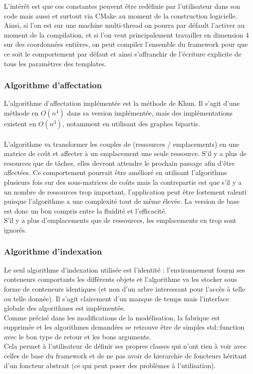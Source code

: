 L'intérêt est que ces constantes peuvent être redéfinie par l'utilisateur dans son code mais aussi et surtout via CMake au moment de la construction logicielle. Ainsi, si l'on est sur une machine multi-thread on pourra par défault l'activer au moment de la compilation, et si l'on veut principalement travailler en dimension 4 sur des coordonnées entières, on peut compiler l'ensemble du framework pour que ce soit le comportement par défaut et ainsi s'affranchir de l'écriture explicite de tous les paramètres des templates. 

\subsubsection{Algorithme d'affectation}

L'algorithme d'affectation implémentée est la méthode de Khun. Il s'agit d'une méthode en $O(n^4)$ dans sa version implémentée, mais des implémentations existent en $O(n^3)$, notamment en utilisant des graphes bipartis.\\\\
L'algorithme va transformer les couples de (ressources / emplacements) en une matrice de coût et affecter à un emplacement une seule ressource. S'il y a plus de resources que de tâches, elles devront attendre le prochain passage afin d'être affectées. Ce comportement pourrait être amélioré en utilisant l'algorithme plusieurs fois sur des sous-matrices de coûts mais la contrepartie est que s'il y a un nombre de ressources trop important, l'application peut être fortement ralenti puisque l'algorithme a une complexité tout de même élevée. La version de base est donc un bon compris entre la fluidité et l'efficacité.\\
S'il y a plus d'emplacements que de ressources, les emplacements en trop sont ignorés.

\subsubsection{Algorithme d'indexation}

Le seul algorithme d'indexation utilisée est l'identité : l'environnement fourni ses conteneurs comportants les différents objets et l'algorithme va les stocker sous forme de conteneurs identiques (et non d'un arbre interessant pour l'accès à telle ou telle donnée). Il s'agit clairement d'un manque de temps mais l'interface globale des algorithmes est implémentée.\\
Comme précisé dans les modifications de la modélisation, la fabrique est supprimée et les algorithmes demandées se retrouve être de simples std::function avec le bon type de retour et les bons arguments.\\
Cela permet à l'utilisateur de définir ses propres classes qui n'ont rien à voir avec celles de base du framework et de ne pas avoir de hierarchie de foncteurs héritant d'un foncteur abstrait (ce qui peut poser des problèmes à l'utilisation).

